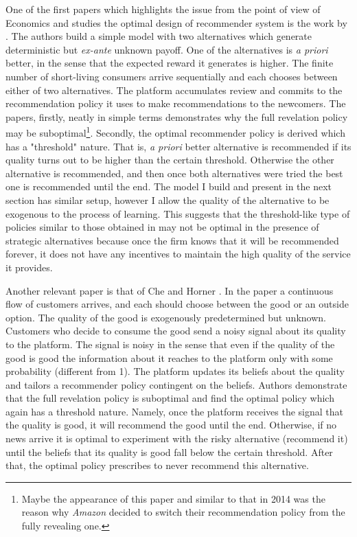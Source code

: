\documentclass[a4paper]{article}
\begin{document}
	
	
	
	
	One of the first papers which highlights the issue from the point of view of Economics and studies the optimal design of recommender system is the work by \cite{kremer2014}. The authors build a simple model with two alternatives which generate deterministic but \textit{ex-ante} unknown payoff. One of the alternatives is \textit{a priori} better, in the sense that the expected reward it generates is higher. The finite number of short-living consumers arrive sequentially and each chooses between either of two alternatives. The platform accumulates review and commits to the recommendation policy it uses to make recommendations to the newcomers. The papers, firstly, neatly in simple terms demonstrates why the full revelation policy may be suboptimal\footnote{Maybe the appearance of this paper and similar to that in 2014 was the reason why \textit{Amazon} decided to switch their recommendation policy from the fully revealing one.}. Secondly, the optimal recommender policy is derived which has a "threshold" nature. That is, \textit{a priori} better alternative is recommended if its quality turns out to be higher than the certain threshold. Otherwise the other alternative is recommended, and then once both alternatives were tried the best one is recommended until the end. The model I build and present in the next section has similar setup, however I allow the quality of the alternative to be exogenous to the process of learning. This suggests that the threshold-like type of policies similar to those obtained in \cite{kremer2014} may not be optimal in the presence of strategic alternatives because once the firm knows that it will be recommended forever, it does not have any incentives to maintain the high quality of the service it provides. 
	
	
	
	
	Another relevant paper is that of Che and Horner \cite{che2015}. In the paper a continuous flow of customers arrives, and each should choose between the good or an outside option. The quality of the good is exogenously predetermined but unknown. Customers who decide to consume the good send a noisy signal about its quality to the platform. The signal is noisy in the sense that even if the quality of the good is good the information about it reaches to the platform only with some probability (different from 1). The platform updates its beliefs about the quality and tailors a recommender policy contingent on the beliefs. Authors demonstrate that the full revelation policy is suboptimal and find the optimal policy which again has a threshold nature. Namely, once the platform receives the signal that the quality is good, it will recommend the good until the end. Otherwise, if no news arrive it is optimal to experiment with the risky alternative (recommend it) until the beliefs that its quality is good fall below the certain threshold. After that, the optimal policy prescribes to never recommend this alternative.
	
\end{document}
